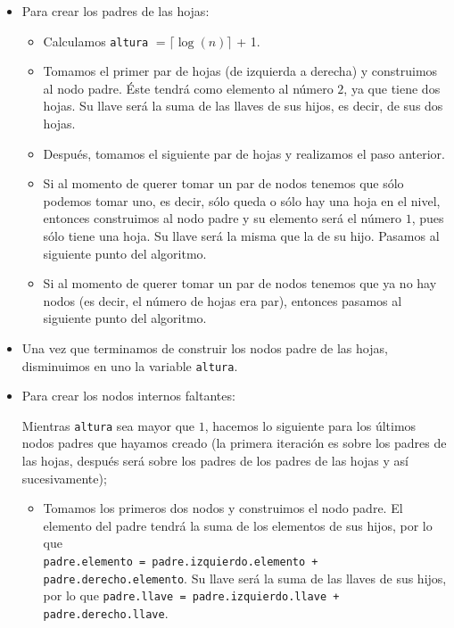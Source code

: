 \documentclass[letterpaper,11pt]{article}
\begin{document}
\begin{enumerate}
\begin{itemize}
\begin{itemize}
            \item Para crear los padres de las hojas:
            \begin{itemize}
                \item Calculamos \texttt{altura} $= \lceil \log(n)\rceil$ + 1. 
    
                \item Tomamos el primer par de hojas (de izquierda a derecha) y 
                construimos al nodo padre. Éste tendrá como elemento al número 
                $2$, ya que tiene dos hojas. Su llave será la suma de las llaves
                de sus hijos, es decir, de sus dos hojas.
    
                \item Después, tomamos el siguiente par de hojas y realizamos el 
                paso anterior. 
                
                \item Si al momento de querer tomar un par de nodos tenemos que 
                sólo podemos tomar uno, es decir, sólo queda o sólo hay una hoja 
                en el nivel, entonces construimos al nodo padre y su elemento 
                será el número $1$, pues sólo tiene una hoja. Su llave será la 
                misma que la de su hijo. Pasamos al siguiente punto del 
                algoritmo.

                \item Si al momento de querer tomar un par de nodos tenemos que 
                ya no hay nodos (es decir, el número de hojas era par), entonces 
                pasamos al siguiente punto del algoritmo.
            \end{itemize}

            \item Una vez que terminamos de construir los nodos padre de las
            hojas, disminuimos en uno la variable \texttt{altura}.

            \item Para crear los nodos internos faltantes:

            Mientras \texttt{altura} sea mayor que $1$, hacemos lo siguiente 
            para los últimos nodos padres que hayamos creado (la primera 
            iteración es sobre los padres de las hojas, después será sobre 
            los padres de los padres de las hojas y así sucesivamente); 
            \begin{itemize}
                \item Tomamos los primeros dos nodos y construimos el nodo 
                padre. El elemento del padre tendrá la suma de los elementos 
                de sus hijos, por lo que \\ 
                \texttt{padre.elemento = padre.izquierdo.elemento + 
                padre.derecho.elemento}. Su llave será la suma de las llaves 
                de sus hijos, por lo que \texttt{padre.llave = 
                padre.izquierdo.llave + padre.derecho.llave}.
    

\end{itemize}
\end{itemize}
\end{itemize}
\end{enumerate}
\end{document}

